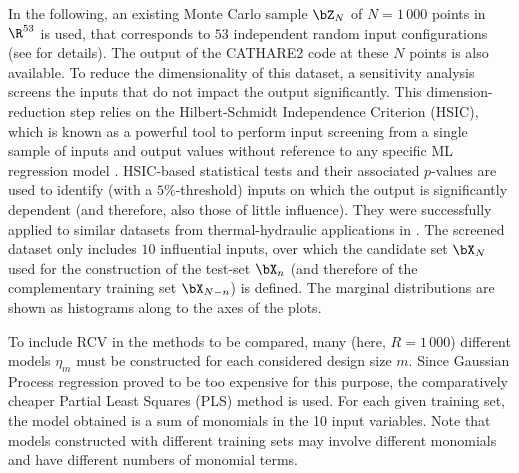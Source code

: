 In the following, an existing Monte Carlo sample $\bZ_N$ of $N=1\,000$ points in $\R^{53}$ is used, that corresponds to $53$ independent random input configurations (see \citealp{ioobou10} for details). 
The output of the CATHARE2 code at these $N$ points is also available. 
To reduce the dimensionality of this dataset, a sensitivity analysis \citep{daveiga_iooss_2021} screens the inputs that do not impact the output significantly. 
This dimension-reduction step relies on the Hilbert-Schmidt Independence Criterion (HSIC), which is known as a powerful tool to perform input screening from a single sample of inputs and output values without reference to any specific ML regression model \citep{daveiga_2015}. 
HSIC-based statistical tests and their associated $p$-values are used to identify (with a $5\%$-threshold) inputs on which the output is significantly dependent (and therefore, also those of little influence). 
They were successfully applied to similar datasets from thermal-hydraulic applications in \citet{marrel_chabridon_2021,marrel_iscream_2022}. 
The screened dataset only includes $10$ influential inputs, over which the candidate set $\bX_N$ used for the construction of the test-set $\bX_n$ (and therefore of the complementary training set $\bX_{N-n}$) is defined. 
The marginal distributions are shown as histograms along to the axes of the plots.

To include RCV in the methods to be compared, many (here, $R=1\,000$) different models $\eta_m$ must be constructed for each considered design size $m$. 
Since Gaussian Process regression proved to be too expensive for this purpose, the comparatively cheaper Partial Least Squares (PLS) method \citep{wolsjo01} is used. 
For each given training set, the model obtained is a sum of monomials in the 10 input variables. 
Note that models constructed with different training sets may involve different monomials and have different numbers of monomial terms. 


